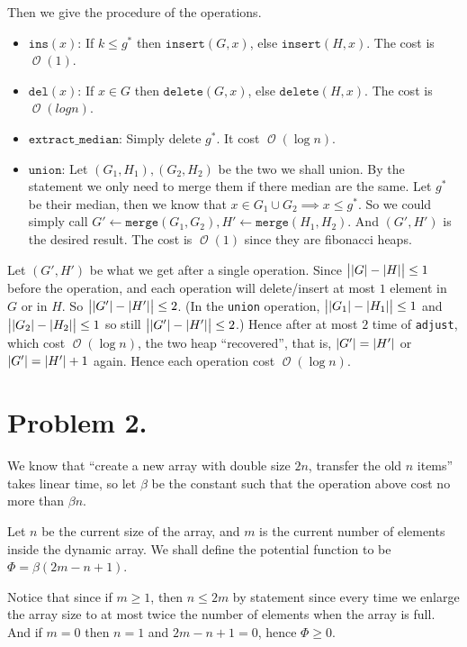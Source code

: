 \documentclass[12pt, a4paper]{article}
\DeclarePairedDelimiter{\abs}{\lvert}{\rvert}
\newcommand{\opord}{\operatorname{\mathcal{O}}}
\newcommand{\ord}[1]{\opord\left(#1\right)}
\begin{document}
Then we give the procedure of the operations.
\begin{itemize}
  \item $\mathtt{ins}(x)$: If $k \leq g^*$ then $\mathtt{insert}(G, x)$, else $\mathtt{insert}(H, x)$.
    The cost is $\ord{1}$.
  \item $\mathtt{del}(x)$: If $x \in G$ then $\mathtt{delete}(G, x)$, else $\mathtt{delete}(H, x)$.
    The cost is $\ord{log n}$.
  \item $\texttt{extract\_median}$: Simply delete $g^*$. It cost $\ord{\log n}$.
  \item $\texttt{union}$: Let $(G_1, H_1), (G_2, H_2)$ be the two we shall union. By the
    statement we only need to merge them if there median are the same. Let $g^*$ be their
    median, then we know that $x \in G_1 \cup G_2 \implies x \leq g^*$. So we could
    simply call $G' \gets \texttt{merge}(G_1, G_2), H' \gets \texttt{merge}(H_1, H_2)$.
    And $(G', H')$ is the desired result. The cost is $\ord{1}$ since they are fibonacci heaps.
\end{itemize}
Let $(G', H')$ be what we get after a single operation. Since $\big| \abs{G} - \abs{H} \big| \leq 1$
before the operation, and each operation will delete/insert at most $1$ element in $G$ or in $H$.
So $\big| \abs{G'} - \abs{H'} \big| \leq 2$.
(In the \texttt{union} operation, $\big| \abs{G_1} - \abs{H_1} \big| \leq 1$ and
$\big| \abs{G_2} - \abs{H_2} \big| \leq 1$ so still $\big| \abs{G'} - \abs{H'} \big| \leq 2$.)
Hence after at most $2$ time of {\tt adjust}, which cost $\ord{\log n}$, the two heap
``recovered'', that is, $\abs{G'} = \abs{H'}$ or $\abs{G'} = \abs{H'} + 1$ again.
Hence each operation cost $\ord{\log n}$.

\section{Problem 2.}
We know that ``create a new array with double size $2n$, transfer the old $n$ items''
takes linear time, so let $\beta$ be the constant such that the operation above
cost no more than $\beta n$.

Let $n$ be the current size of the array, and $m$ is the current number of elements inside
the dynamic array. We shall define the potential function to be $\Phi = \beta (2m - n + 1)$.

Notice that since if $m \geq 1$, then $n \leq 2m$ by statement since every time we enlarge the array
size to at most twice the number of elements when the array is full. And if $m = 0$ then $n = 1$ and
$2m - n + 1 = 0$, hence $\Phi \geq 0$.
\end{document}
